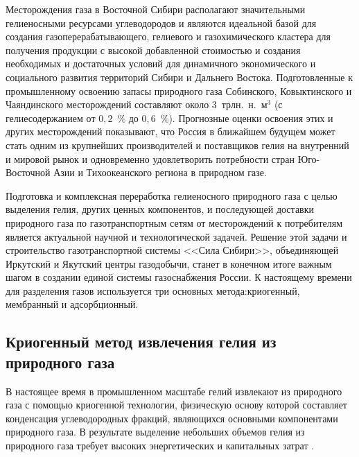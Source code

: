 
Месторождения газа в Восточной Сибири располагают значительными гелиеносными ресурсами углеводородов и являются идеальной базой для создания газоперерабатывающего, гелиевого и газохимического кластера для получения продукции с высокой добавленной стоимостью и создания необходимых и достаточных условий для динамичного экономического и социального развития территорий Сибири и Дальнего Востока. Подготовленные к промышленному освоению запасы природного газа Собинского, Ковыктинского и Чаяндинского месторождений составляют около $3$~трлн.~н.~м$^3$ (с гелиесодержанием от $0,2$~\% до $0,6$~\%). Прогнозные оценки освоения этих и других месторождений показывают, что Россия в ближайшем будущем может стать одним из крупнейших производителей и поставщиков гелия на внутренний и мировой рынок и одновременно удовлетворить потребности стран Юго-Восточной Азии и Тихоокеанского региона в природном газе.

Подготовка и комплексная переработка гелиеносного природного газа с целью выделения гелия, других ценных компонентов, и последующей доставки природного газа по газотранспортным сетям от месторождений к потребителям является актуальной научной и технологической задачей. Решение этой задачи и строительство газотранспортной системы <<Сила Сибири>>, объединяющей Иркутский и Якутский центры газодобычи, станет в конечном итоге важным шагом в создании единой системы газоснабжения России.
К настоящему времени для разделения газов используется три основных метода:криогенный, мембранный и адсорбционный.



\subsection{Криогенный метод извлечения гелия из природного газа} \label{section_1_1_1}

В настоящее время в промышленном масштабе гелий извлекают из природного газа с помощью криогенной технологии, физическую основу которой составляет конденсация углеводородных фракций, являющихся основными компонентами природного газа.   В результате выделение небольших объемов гелия из природного газа требует высоких энергетических и капитальных  затрат \cite{Andreev}.

